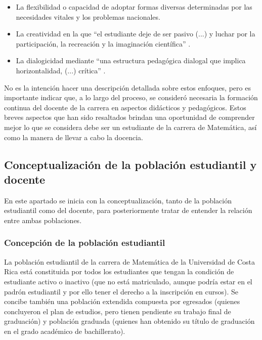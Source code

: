 \begin{itemize}
    
    \color{blue} \item \color{black} La flexibilidad o capacidad de adoptar formas diversas determinadas por las necesidades vitales y los problemas nacionales. 

     \color{blue} \item \color{black} La creatividad en la que “el estudiante deje de ser pasivo (...) y luchar por la participación, la recreación y la imaginación científica” \cite{Gonzalez2014}.
     
    \color{blue} \item \color{black} La dialogicidad mediante “una estructura pedagógica dialogal que implica horizontalidad, (...) crítica” \cite{Gonzalez2014}. 
    \end{itemize}
    
No es la intención hacer una descripción detallada sobre estos enfoques, pero es importante indicar que, a lo largo del proceso, se consideró necesaria la formación continua del docente de la carrera en aspectos didácticos y pedagógicos. Estos breves aspectos que han sido resaltados brindan una oportunidad de comprender mejor lo que se considera debe ser un estudiante de la carrera de Matemática, así como la manera de llevar a cabo la docencia. 

\subsection{Conceptualización de la población estudiantil y docente}

En este apartado se inicia con la conceptualización, tanto de la población estudiantil como del docente, para posteriormente tratar de entender la relación entre ambas poblaciones.

\subsubsection*{Concepción de la población estudiantil}

La población estudiantil de la carrera de Matemática de la Universidad de Costa Rica está constituida por todos los estudiantes que tengan la condición de estudiante activo o inactivo (que no está matriculado, aunque podría estar en el padrón estudiantil y por ello tener el derecho a la inscripción en cursos). Se concibe también una población extendida compuesta por egresados (quienes concluyeron el plan de estudios, pero tienen pendiente su trabajo final de graduación) y población graduada (quienes han obtenido su título de graduación en el grado académico de bachillerato). 


